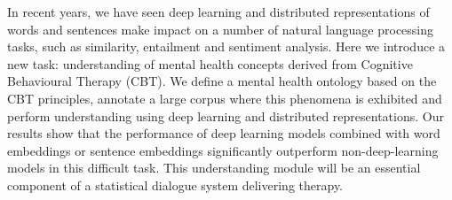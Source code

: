 In recent years, we have seen deep learning and distributed representations of words and sentences make impact on a number of natural language processing tasks, such as similarity, entailment and sentiment analysis. Here we introduce a new task: understanding of mental health concepts derived from Cognitive Behavioural Therapy (CBT). We define a mental health ontology based on the CBT principles, annotate a large corpus where this phenomena is exhibited and perform understanding using deep learning and distributed representations. Our results show that the performance of deep learning models combined with word embeddings or sentence embeddings significantly outperform non-deep-learning models in this difficult task. This understanding module will be an essential component of a statistical dialogue system delivering therapy.
